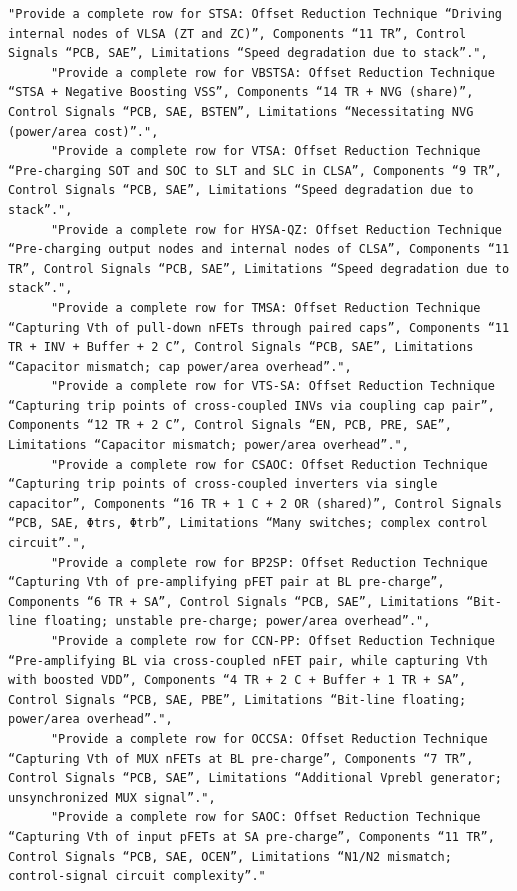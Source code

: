 \documentclass[11pt]{article}
\begin{document}
\begin{tcolorbox}[
  breakable,
  colback=porcelain,
  colframe=gray!75!black,
  left=6pt, right=6pt, top=6pt, bottom=6pt,
  fontupper=\small
]
\begin{lstlisting}[basicstyle=\ttfamily\footnotesize, breaklines=true, frame=none, numbers=none]
      "Provide a complete row for STSA: Offset Reduction Technique “Driving internal nodes of VLSA (ZT and ZC)”, Components “11 TR”, Control Signals “PCB, SAE”, Limitations “Speed degradation due to stack”.",
      "Provide a complete row for VBSTSA: Offset Reduction Technique “STSA + Negative Boosting VSS”, Components “14 TR + NVG (share)”, Control Signals “PCB, SAE, BSTEN”, Limitations “Necessitating NVG (power/area cost)”.",
      "Provide a complete row for VTSA: Offset Reduction Technique “Pre-charging SOT and SOC to SLT and SLC in CLSA”, Components “9 TR”, Control Signals “PCB, SAE”, Limitations “Speed degradation due to stack”.",
      "Provide a complete row for HYSA-QZ: Offset Reduction Technique “Pre-charging output nodes and internal nodes of CLSA”, Components “11 TR”, Control Signals “PCB, SAE”, Limitations “Speed degradation due to stack”.",
      "Provide a complete row for TMSA: Offset Reduction Technique “Capturing Vth of pull-down nFETs through paired caps”, Components “11 TR + INV + Buffer + 2 C”, Control Signals “PCB, SAE”, Limitations “Capacitor mismatch; cap power/area overhead”.",
      "Provide a complete row for VTS-SA: Offset Reduction Technique “Capturing trip points of cross-coupled INVs via coupling cap pair”, Components “12 TR + 2 C”, Control Signals “EN, PCB, PRE, SAE”, Limitations “Capacitor mismatch; power/area overhead”.",
      "Provide a complete row for CSAOC: Offset Reduction Technique “Capturing trip points of cross-coupled inverters via single capacitor”, Components “16 TR + 1 C + 2 OR (shared)”, Control Signals “PCB, SAE, Φtrs, Φtrb”, Limitations “Many switches; complex control circuit”.",
      "Provide a complete row for BP2SP: Offset Reduction Technique “Capturing Vth of pre-amplifying pFET pair at BL pre-charge”, Components “6 TR + SA”, Control Signals “PCB, SAE”, Limitations “Bit-line floating; unstable pre-charge; power/area overhead”.",
      "Provide a complete row for CCN-PP: Offset Reduction Technique “Pre-amplifying BL via cross-coupled nFET pair, while capturing Vth with boosted VDD”, Components “4 TR + 2 C + Buffer + 1 TR + SA”, Control Signals “PCB, SAE, PBE”, Limitations “Bit-line floating; power/area overhead”.",
      "Provide a complete row for OCCSA: Offset Reduction Technique “Capturing Vth of MUX nFETs at BL pre-charge”, Components “7 TR”, Control Signals “PCB, SAE”, Limitations “Additional Vprebl generator; unsynchronized MUX signal”.",
      "Provide a complete row for SAOC: Offset Reduction Technique “Capturing Vth of input pFETs at SA pre-charge”, Components “11 TR”, Control Signals “PCB, SAE, OCEN”, Limitations “N1/N2 mismatch; control-signal circuit complexity”."

\end{lstlisting}
\end{tcolorbox}
\end{document}
